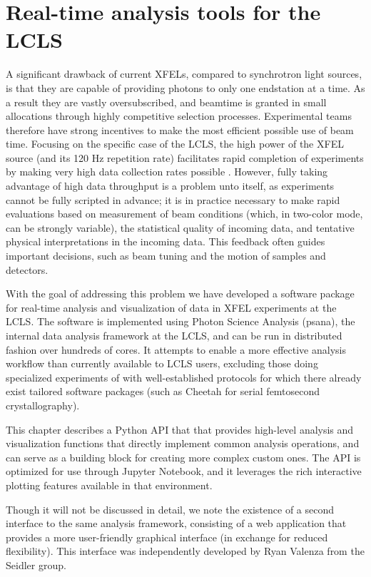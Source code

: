 \chapter{Real-time analysis tools for the LCLS}
\label{xap}

A significant drawback of current XFELs, compared to synchrotron light sources, is that they are capable of providing photons to only one endstation at a time. As a result they are vastly oversubscribed, and beamtime is granted in small allocations through highly competitive selection processes. Experimental teams therefore have strong incentives to make the most efficient possible use of beam time. Focusing on the specific case of the LCLS, the high power of the XFEL source (and its 120 Hz repetition rate) facilitates rapid completion of experiments by making very high data collection rates possible . However, fully taking advantage of high data throughput is a problem unto itself, as experiments cannot be fully scripted in advance; it is in practice necessary to make rapid evaluations based on measurement of beam conditions (which, in two-color mode, can be strongly variable), the statistical quality of incoming data, and tentative physical interpretations in the incoming data. This feedback often guides important decisions, such as beam tuning and the motion of samples and detectors. 

With the goal of addressing this problem we have developed a software package for real-time analysis and visualization of data in XFEL experiments at the LCLS. The software is implemented using Photon Science Analysis (psana), the internal data analysis framework at the LCLS, and can be run in distributed fashion over hundreds of cores. \cite{damiani2016linac} It attempts to enable a more effective analysis workflow than currently available to LCLS users, excluding those doing specialized experiments of with well-established protocols for which there already exist tailored software packages (such as Cheetah for serial femtosecond crystallography). \cite{barty2014cheetah}

This chapter describes a Python API that that provides high-level analysis and visualization functions that directly implement common analysis operations, and can serve as a building block for creating more complex custom ones. The API is optimized for use through Jupyter Notebook, and it leverages the rich interactive plotting features available in that environment.

Though it will not be discussed in detail, we note the existence of a second interface to the same analysis framework, consisting of a web application that provides a more user-friendly graphical interface (in exchange for reduced flexibility). This interface was independently developed by Ryan Valenza from the Seidler group.



